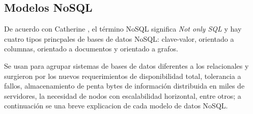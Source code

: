 \subsection{Modelos NoSQL}
De acuerdo con Catherine \cite{cristina_marta_bender_topicos_nodate}, el término NoSQL significa \textit{Not only SQL} y hay cuatro tipos princpales de bases de datos NoSQL: clave-valor, orientado a columnas, orientado a documentos y orientado a grafos. 


Se usan para agrupar sistemas de bases de datos diferentes a los relacionales y surgieron por los nuevos requerimientos de disponibilidad total, tolerancia a fallos, almacenamiento de penta bytes de información distribuida en miles de servidores, la necesidad de nodos con escalabilidad horizontal, entre otros; a continuación se una breve explicacion de cada modelo de datos NoSQL.